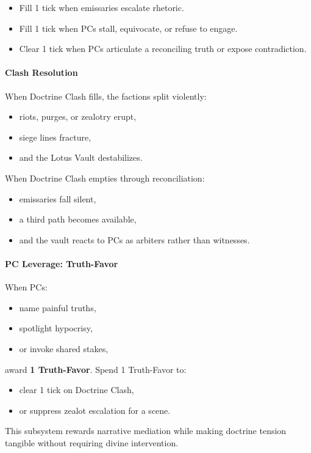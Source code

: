\documentclass[11pt]{article}
\begin{document}
\begin{itemize}[leftmargin=*]
  \item Fill 1 tick when emissaries escalate rhetoric.
  \item Fill 1 tick when PCs stall, equivocate, or refuse to engage.
  \item Clear 1 tick when PCs articulate a reconciling truth or expose
        contradiction.
\end{itemize}

\paragraph{Clash Resolution}
When Doctrine Clash fills, the factions split violently:
\begin{itemize}[leftmargin=*]
  \item riots, purges, or zealotry erupt,
  \item siege lines fracture,
  \item and the Lotus Vault destabilizes.
\end{itemize}

When Doctrine Clash empties through reconciliation:
\begin{itemize}[leftmargin=*]
  \item emissaries fall silent,
  \item a third path becomes available,
  \item and the vault reacts to PCs as arbiters rather than witnesses.
\end{itemize}

\paragraph{PC Leverage: Truth-Favor}
When PCs:
\begin{itemize}[leftmargin=*]
  \item name painful truths,
  \item spotlight hypocrisy,
  \item or invoke shared stakes,
\end{itemize}
award \textbf{1 Truth-Favor}.  
Spend 1 Truth-Favor to:
\begin{itemize}[leftmargin=*]
  \item clear 1 tick on Doctrine Clash,
  \item or suppress zealot escalation for a scene.
\end{itemize}

\medskip
\noindent
This subsystem rewards narrative mediation while making doctrine tension
tangible without requiring divine intervention.
\end{document}

